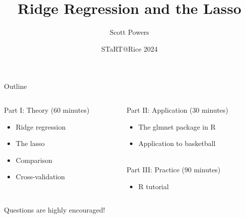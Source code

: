 \documentclass{beamer}
\title{Ridge Regression and the Lasso}
\author{Scott Powers}
\date{STaRT@Rice 2024}
\begin{document}
  \begin{frame}
    \maketitle
  \end{frame}

  \begin{frame}{Outline}
    \begin{columns}
      \begin{column}{0.45\textwidth}
        Part I: Theory (60 minutes)
        \begin{itemize}
          \item Ridge regression
          \item The lasso
          \item Comparison
          \item Cross-validation
        \end{itemize}
      \end{column}
      \begin{column}{0.55\textwidth}
        Part II: Application (30 minutes)
        \begin{itemize}
          \item The glmnet package in R
          \item Application to basketball
        \end{itemize}
        ~\\
        Part III: Practice (90 minutes)
        \begin{itemize}
          \item R tutorial
        \end{itemize}
      \end{column}
    \end{columns}
    \vfill
    Questions are highly encouraged!
  \end{frame}
\end{document}
